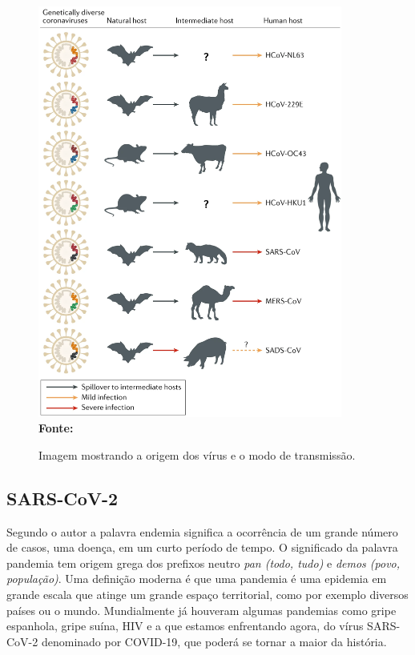 \documentclass[
  fleqn,ebook]{ic}
\begin{document}
\begin{figure}[H]
    \centering
    \caption{Imagem mostrando a origem dos vírus e o modo de transmissão.}
    \includegraphics[width=10cm]{img/origin.png} \\
    {\footnotesize \textbf{Fonte: }\cite{cui2019origin}}
    \label{fig:origin}
\end{figure}

\hypertarget{sars-cov-2}{%
\subsection{SARS-CoV-2}\label{sars-cov-2}}

Segundo o autor \cite{de1998epidemia} a palavra endemia significa a ocorrência
de um grande número de casos, uma doença, em um curto período de
tempo. O significado da palavra pandemia tem origem grega dos prefixos neutro
\emph{pan (todo, tudo)} e \emph{demos (povo, população)}. Uma definição moderna é que uma
pandemia é uma epidemia em grande escala que atinge um grande espaço
territorial, como por exemplo diversos países ou o mundo. Mundialmente já
houveram algumas pandemias como gripe espanhola, gripe suína, HIV
e a que estamos enfrentando agora, do vírus SARS-CoV-2 denominado por COVID-19,
que poderá se tornar a maior da história.
\end{document}
